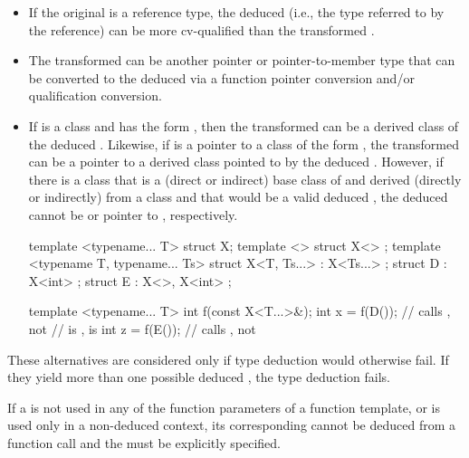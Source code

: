 \begin{itemize}
\item
If the original
is a reference type, the deduced
(i.e.,
the type referred to by the reference) can be more cv-qualified than
the transformed .
\item
The transformed 
can be another pointer or pointer-to-member type that can be converted
to the deduced
via a function pointer conversion and/or
qualification conversion.

\item
If
is a class and
has the form
,
then
the transformed 
can be a derived class  of the
deduced
.
Likewise, if
is a pointer to a class of the form
,
the transformed 
can be a pointer to a
derived class  pointed to by the deduced
.
However, if there is a class  that is
a (direct or indirect) base class of  and
derived (directly or indirectly) from a class  and
that would be a valid deduced ,
the deduced  cannot be  or pointer to ,
respectively.
\begin{example}
\begin{codeblock}
template <typename... T> struct X;
template <> struct X<> {};
template <typename T, typename... Ts>
  struct X<T, Ts...> : X<Ts...> {};
struct D : X<int> {};
struct E : X<>, X<int> {};

template <typename... T>
int f(const X<T...>&);
int x = f(D());     // calls , not 
                    //  is ,  is 
int z = f(E());     // calls , not 
\end{codeblock}
\end{example}
\end{itemize}

\pnum
These alternatives are considered only if type deduction would
otherwise fail.
If they yield more than one possible deduced
,
the type deduction fails.
\begin{note}
If a
is not used in any of the function parameters of a function template,
or is used only in a non-deduced context, its corresponding
cannot be deduced from a function call and the
must be explicitly specified.
\end{note}


